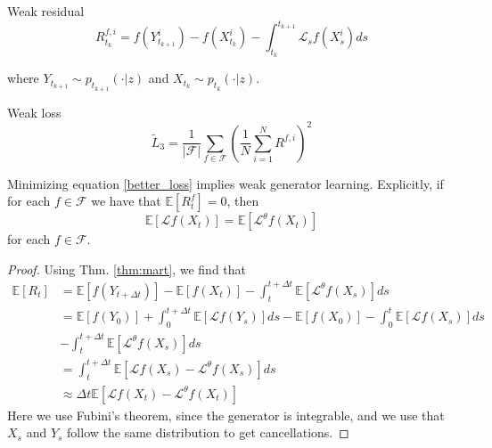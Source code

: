 \documentclass{beamer}
\begin{document}
\begin{frame}
\begin{block}{Weak residual}
\begin{equation}
	R_{t_k}^{f,i} = f(Y_{t_{k+1}}^i) - f(X_{t_k}^i) - \int_{t_k}^{t_{k+1}}\mathcal{L}_sf(X_s^i)ds
\end{equation}

where $Y_{t_{k+1}} \sim p_{t_{k+1}}(\cdot|z)$ and $X_{t_k} \sim p_{t_k}(\cdot|z)$.
\end{block}

\begin{block}{Weak loss}
\begin{equation}
	\label{better_loss}
	\tilde L_3 = \frac{1}{|\mathcal{F}|} \sum_{f \in \mathcal{F}} \left(\frac{1}{N}\sum_{i=1}^{N} R^{f, i}\right)^2
\end{equation}
\end{block}

\begin{theorem}
	Minimizing equation \ref{better_loss} implies weak generator learning. Explicitly, if for each $f \in \mathcal{F}$ we have that $\mathbb{E}[R^f_t] = 0$, then \[\mathbb{E}[\mathcal{L} f(X_t)] = \mathbb{E}[\mathcal{L}^\theta f(X_t)]\] for each $f \in \mathcal{F}$.
\end{theorem}
\end{frame}

\begin{frame}

\begin{proof}
	Using Thm. \ref{thm:mart}, we find that
	\begin{align*}
		\mathbb{E}[R_t] &= \mathbb{E}[f(Y_{t+\Delta t})] - \mathbb{E}[f(X_t)] - \int_t^{t+\Delta t} \mathbb{E}[\mathcal{L}^\theta f(X_s)]ds \\
						&= \mathbb{E}[f(Y_0)] + \int_0^{t+\Delta t} \mathbb{E} [\mathcal{L}f(Y_s)] ds - \mathbb{E}[f(X_0)] - \int_0^{t} \mathbb{E}  [\mathcal{L}f(X_s)] ds \\ &- \int_t^{t+\Delta t} \mathbb{E}[\mathcal{L}^\theta f(X_s)]ds \\
							 &= \int_t^{t+\Delta t} \mathbb{E}[\mathcal{L} f(X_s) - \mathcal{L}^\theta f(X_s)]ds \\
							 &\approx \Delta t \mathbb{E}[\mathcal{L} f(X_t) - \mathcal{L}^\theta f(X_t)]
	\end{align*}
	Here we use Fubini's theorem, since the generator is integrable, and we use that $X_s$ and $Y_s$ follow the same distribution to get cancellations.
\end{proof}
\end{frame}
\end{document}
